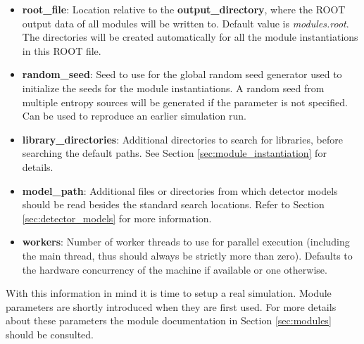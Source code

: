 \begin{itemize}
\item \textbf{root\_file}: Location relative to the \textbf{output\_directory}, where the ROOT output data of all modules will be written to. Default value is \textit{modules.root}. The directories will be created automatically for all the module instantiations in this ROOT file.
\item \textbf{random\_seed}: Seed to use for the global random seed generator used to initialize the seeds for the module instantiations. A random seed from multiple entropy sources will be generated if the parameter is not specified. Can be used to reproduce an earlier simulation run.
\item \textbf{library\_directories}: Additional directories to search for libraries, before searching the default paths. See Section \ref{sec:module_instantiation} for details.
\item \textbf{model\_path}: Additional files or directories from which detector models should be read besides the standard search locations. Refer to Section \ref{sec:detector_models} for more information.
\item \textbf{workers}: Number of worker threads to use for parallel execution (including the main thread, thus should always be strictly more than zero). Defaults to the hardware concurrency of the machine if available or one otherwise.
\end{itemize}

With this information in mind it is time to setup a real simulation. Module parameters are shortly introduced when they are first used. For more details about these parameters the module documentation in Section \ref{sec:modules} should be consulted.

